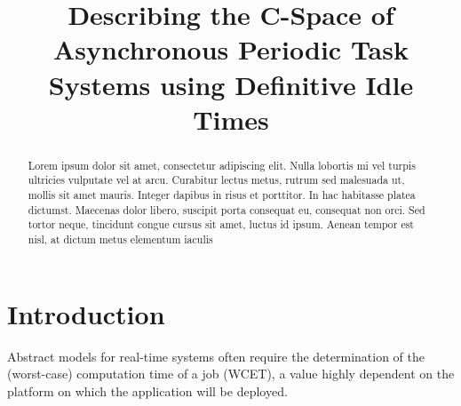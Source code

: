 \documentclass[conference]{IEEEtran}
\begin{document}
%
\title{Describing the C-Space of Asynchronous Periodic Task Systems using
Definitive Idle Times}


\author{
\and
{}
}
\maketitle


\begin{abstract}
  Lorem ipsum dolor sit amet, consectetur adipiscing elit. Nulla lobortis mi vel
turpis ultricies vulputate vel at arcu. Curabitur lectus metus, rutrum sed malesuada ut, mollis sit amet mauris. Integer dapibus in risus et porttitor. In hac habitasse platea dictumst. Maecenas dolor libero, suscipit porta consequat eu, consequat non orci. Sed tortor neque, tincidunt congue cursus sit amet, luctus id ipsum. Aenean tempor est nisl, at dictum metus elementum iaculis
\end{abstract}




%
\IEEEpeerreviewmaketitle



\section{Introduction}

  Abstract models for real-time systems often require the determination of the
  (worst-case) computation time of a job (WCET), a value highly dependent on the
  platform on which the application will be deployed.\\
\end{document}
